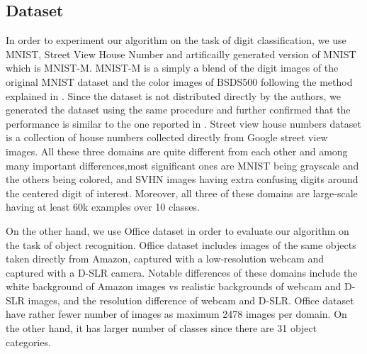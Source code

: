 \begin{table}[ht]
\caption{Accuracy of our method and the digit classification task.}
\label{tab:res2}
\begin{sc}
\begin{small}
\end{small}
\end{sc}
\end{table}
\subsection{Dataset}
In order to experiment our algorithm on the task of digit classification, we use MNIST\cite{mnist}, Street View House Number\cite{svhn} and artificailly generated version of MNIST which is MNIST-M\cite{ganin15}. MNIST-M is a simply a blend of the digit images of the original MNIST dataset and the color images of BSDS500\cite{bsds500} following the method explained in \cite{ganin15}. Since the dataset is not distributed directly by the authors, we generated the dataset using the same procedure and further confirmed that the performance is similar to the one reported in \cite{ganin15}. Street view house numbers dataset is a collection of house numbers collected directly from Google street view images. All these three domains are quite different from each other and among many important differences,most significant ones are MNIST being grayscale and the others being colored, and SVHN images having extra confusing digits around the centered digit of interest. Moreover, all three of these domains are large-scale having at least 60k examples over 10 classes. 

On the other hand, we use Office\cite{office} dataset in order to evaluate our algorithm on the task of object recognition. Office dataset includes images of the same objects taken directly from Amazon, captured with a low-resolution webcam and captured with a D-SLR camera. Notable differences of these domains include the white background of Amazon images vs realistic backgrounds of webcam and D-SLR images, and the resolution difference of webcam and D-SLR. Office dataset have rather fewer number of images as maximum 2478 images per domain. On the other hand, it has larger number of classes since there are 31 object categories.




